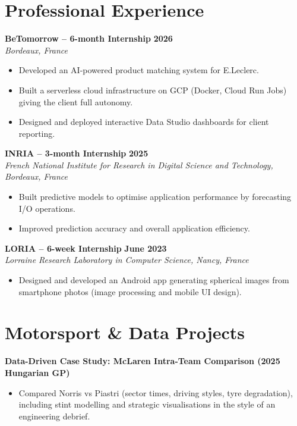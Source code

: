 \documentclass[10pt,a4paper]{article}
\newcommand{\entry}[3]{%
  \textbf{#1} \hfill \textbf{#2}\\
  \textit{#3}\par\vspace{-2pt}
}
\newcommand{\entryone}[2]{%
  \textbf{#1} \hfill \textbf{#2}\par\vspace{-2pt}
}
\begin{document}
\section{Professional Experience}

\entry{BeTomorrow -- 6-month Internship}{2026}{Bordeaux, France}
\begin{itemize}
  \item Developed an AI-powered product matching system for E.Leclerc.
  \item Built a serverless cloud infrastructure on GCP (Docker, Cloud Run Jobs) giving the client full autonomy.
  \item Designed and deployed interactive Data Studio dashboards for client reporting.
\end{itemize}

\vspace{2pt}
\entry{INRIA -- 3-month Internship}{2025}{French National Institute for Research in Digital Science and Technology, Bordeaux, France}
\begin{itemize}
  \item Built predictive models to optimise application performance by forecasting I/O operations.
  \item Improved prediction accuracy and overall application efficiency.
\end{itemize}

\vspace{2pt}
\entry{LORIA -- 6-week Internship}{June 2023}{Lorraine Research Laboratory in Computer Science, Nancy, France}
\begin{itemize}
  \item Designed and developed an Android app generating spherical images from smartphone photos (image processing and mobile UI design).
\end{itemize}

\section{Motorsport \& Data Projects}

\entryone{Data-Driven Case Study: McLaren Intra-Team Comparison (2025 Hungarian GP)}{}
\begin{itemize}
  \item Compared Norris vs Piastri (sector times, driving styles, tyre degradation), including stint modelling and strategic visualisations in the style of an engineering debrief.
\end{itemize}
\end{document}
